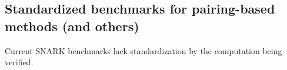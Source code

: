 \subsection{Standardized benchmarks for pairing-based methods (and others)}
\noindent Current SNARK benchmarks lack standardization by the computation being verified.\\


%
%
